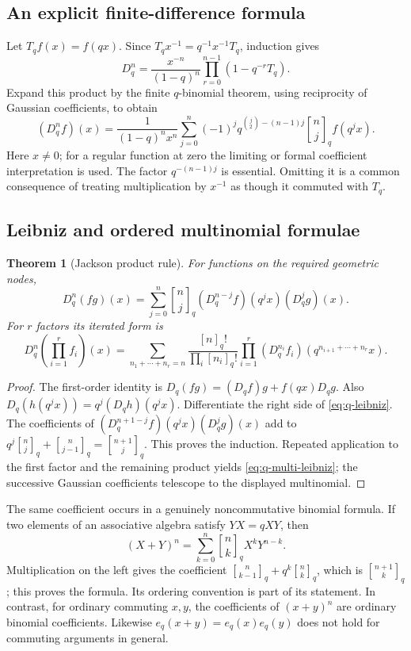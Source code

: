 \documentclass[11pt,a4paper]{article}
\numberwithin{equation}{section}
\newtheorem{theorem}{Theorem}[section]
\theoremstyle{definition}
\theoremstyle{remark}
\newcommand{\G}[2]{\genfrac{[}{]}{0pt}{}{#1}{#2}_{q}}
\newcommand{\qfac}[1]{[#1]_q!}
\newcommand{\Dq}{D_q}
\begin{document}
\subsection{An explicit finite-difference formula}
Let $T_qf(x)=f(qx)$. Since $T_qx^{-1}=q^{-1}x^{-1}T_q$, induction gives
\[
 \Dq^n=\frac{x^{-n}}{(1-q)^n}
             \prod_{r=0}^{n-1}(1-q^{-r}T_q).
\]
Expand this product by the finite $q$-binomial theorem, using reciprocity
of Gaussian coefficients, to obtain
\begin{equation}
 \boxed{\displaystyle
 (\Dq^nf)(x)=\frac{1}{(1-q)^nx^n}
   \sum_{j=0}^n(-1)^j q^{\binom j2-(n-1)j}
             \G nj f(q^jx).}
 \label{eq:q-difference-explicit}
\end{equation}
Here $x\ne0$; for a regular function at zero the limiting or formal
coefficient interpretation is used. The factor $q^{-(n-1)j}$ is
essential. Omitting it is a common consequence of treating multiplication
by $x^{-1}$ as though it commuted with $T_q$.

\subsection{Leibniz and ordered multinomial formulae}
\begin{theorem}[Jackson product rule]
For functions on the required geometric nodes,
\begin{equation}
 \Dq^n(fg)(x)=\sum_{j=0}^n\G nj
       (\Dq^{n-j}f)(q^jx)(\Dq^jg)(x).
 \label{eq:q-leibniz}
\end{equation}
For $r$ factors its iterated form is
\begin{equation}
 \Dq^n\!\left(\prod_{i=1}^rf_i\right)(x)
 =\sum_{n_1+\cdots+n_r=n}
    \frac{\qfac n}{\prod_i\qfac{n_i}}
    \prod_{i=1}^r(\Dq^{n_i}f_i)
              \left(q^{n_{i+1}+\cdots+n_r}x\right).
 \label{eq:q-multi-leibniz}
\end{equation}
\end{theorem}
\begin{proof}
The first-order identity is
$\Dq(fg)=(\Dq f)g+f(qx)\Dq g$.
Also $\Dq(h(q^jx))=q^j(\Dq h)(q^jx)$.
Differentiate the right side of \cref{eq:q-leibniz}. The coefficients of
$(\Dq^{n+1-j}f)(q^jx)(\Dq^jg)(x)$ add to
$q^j\G nj+\G n{j-1}=\G{n+1}j$.
This proves the induction. Repeated application to the first factor and
the remaining product yields \cref{eq:q-multi-leibniz}; the successive
Gaussian coefficients telescope to the displayed multinomial.
\end{proof}

The same coefficient occurs in a genuinely noncommutative binomial
formula. If two elements of an associative algebra satisfy $YX=qXY$,
then
\begin{equation}
 (X+Y)^n=\sum_{k=0}^n\G nk X^kY^{n-k}.
 \label{eq:quantum-binomial}
\end{equation}
Multiplication on the left gives the coefficient
$\G n{k-1}+q^k\G nk$, which is $\G{n+1}k$; this proves the formula.
Its ordering convention is part of its statement. In contrast, for
ordinary commuting $x,y$, the coefficients of $(x+y)^n$ are ordinary
binomial coefficients. Likewise $e_q(x+y)=e_q(x)e_q(y)$ does not hold
for commuting arguments in general.
\end{document}
